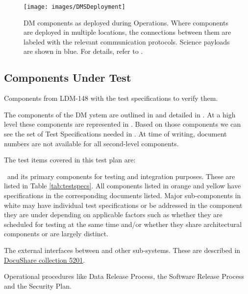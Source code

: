 \begin{figure}[htbp]
	\begin{center}
		\texttt{[image: images/DMSDeployment]}
		\caption{DM components as deployed during Operations. Where components are
			deployed in multiple locations, the connections between them are labeled with
			the relevant communication protocols. Science payloads are shown in blue.
            For details, refer to .
		\label{fig:dmsdeploy}}
	\end{center}
\end{figure}

\subsection{Components Under Test}

\begin{table}
	\caption{Components from LDM-148 with the test specifications to verify them. \label{tab:testspecs}}
	
\end{table}

The components of the DM ystem are outlined in  and detailed in . At a high level these components are represented in . Based on those components we can see the set of Test Specifications needed in . At time of writing, document numbers are not available for all second-level components.

The test items covered in this test plan are:

\begin{itemize_single}
\item \product\ and its primary components for testing and integration purposes. These are listed in Table \ref{tab:testspecs}. All components listed in orange and yellow have specifications in the corresponding documents listed. Major sub-components in white may have individual test specifications or be addressed in the component they are under depending on applicable factors such as whether they are scheduled for testing at the same time and/or whether they share architectural components or are largely distinct.

\item The external interfaces between \product{} and other sub-systems. These are described in \href{https://ls.st/Collection-5201}{DocuShare collection 5201}.

\item Operational procedures like Data Release Process, the Software Release Process and the Security Plan.

\end{itemize_single}

